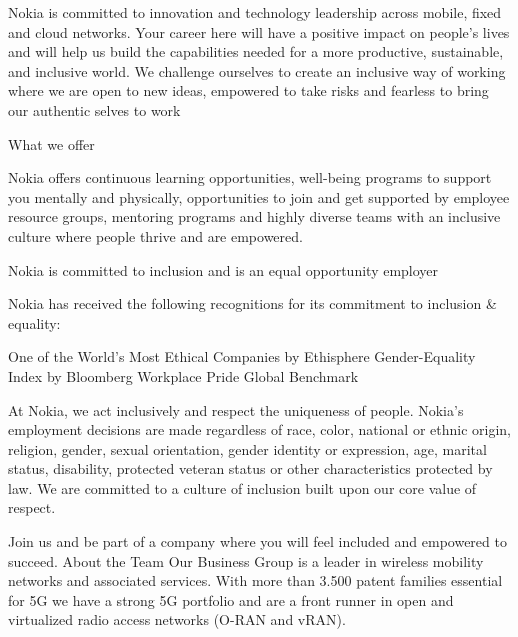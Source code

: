 Nokia is committed to innovation and technology leadership across mobile, fixed and cloud networks. Your career here will have a positive impact on people’s lives and will help us build the capabilities needed for a more productive, sustainable, and inclusive world.
We challenge ourselves to create an inclusive way of working where we are open to new ideas, empowered to take risks and fearless to bring our authentic selves to work

What we offer
 
Nokia offers continuous learning opportunities, well-being programs to support you mentally and physically, opportunities to join and get supported by employee resource groups, mentoring programs and highly diverse teams with an inclusive culture where people thrive and are empowered.

Nokia is committed to inclusion and is an equal opportunity employer

Nokia has received the following recognitions for its commitment to inclusion & equality:

One of the World’s Most Ethical Companies by Ethisphere
Gender-Equality Index by Bloomberg
Workplace Pride Global Benchmark

At Nokia, we act inclusively and respect the uniqueness of people. Nokia’s employment decisions are made regardless of race, color, national or ethnic origin, religion, gender, sexual orientation, gender identity or expression, age, marital status, disability, protected veteran status or other characteristics protected by law.
We are committed to a culture of inclusion built upon our core value of respect.

Join us and be part of a company where you will feel included and empowered to succeed.
About the Team
Our Business Group is a leader in wireless mobility networks and associated services. With more than 3.500 patent families essential for 5G we have a strong 5G portfolio and are a front runner in open and virtualized radio access networks (O-RAN and vRAN). 
